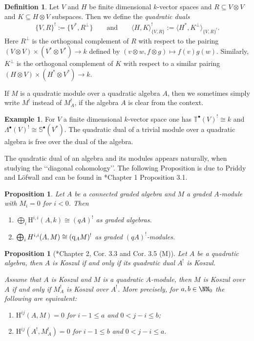 \documentclass{amsart}
\newtheorem{prop}[thm]{Proposition}
\theoremstyle{definition}
\newtheorem{defn}[thm]{Definition}
\newtheorem{exmp}[thm]{Example}
\theoremstyle{remark}
\newcommand{\rmH}{\mathrm{H}}
\numberwithin{equation}{section}
\begin{document}
\begin{defn}
    Let $V$ and $H$ be finite dimensional $k$-vector spaces and $R\subseteq V\otimes V$ and $K\subseteq H\otimes V$ subspaces. Then we define the \emph{quadratic duals}
    \begin{align*}
        \{V,R\}^!:=\{V^*,R^\perp\}\qquad \text{and}\qquad \langle H,K\rangle^!_{\{V,R\}}:=\langle H^*,K^\perp\rangle_{\{V,R\}^!}.
    \end{align*}
    Here $R^\perp$ is the orthogonal complement of $R$ with respect to the pairing $(V\otimes V)\times (V^*\otimes V^*)\to k$ defined by $(v\otimes w,f\otimes g)\mapsto f(v)g(w)$. Similarly, $K^\perp$ is the orthogonal complement of $K$ with respect to a similar pairing $(H\otimes V)\times (H^*\otimes V^*)\to k$.
\end{defn}
If $M$ is a quadratic module over a quadratic algebra $A$, then we sometimes simply write $M^!$ instead of $M^!_A$, if the algebra $A$ is clear from the context.
\begin{exmp}
    For $V$ a finite dimensional $k$-vector space one has $\mathbb{T}^\bullet(V)^!\cong k$ and $\Lambda^\bullet(V)^!\cong \mathbb{S}^\bullet(V^*)$. The quadratic dual of a trivial module over a quadratic algebra is free over the dual of the algebra. 
\end{exmp}
The quadratic dual of an algebra and its modules appears naturally, when studying the \lq\lq diagonal cohomology\rq\rq. The following Proposition is due to Priddy \cite{Priddy1970} and Löfwall \cite{Loeffwall1986} and can be found in \cite{PositselskiPolishchuk2005}*{Chapter 1 Proposition 3.1}.
\begin{prop}
\label{prop:CohomologyAndDuals}
    Let $A$ be a connected graded algebra and $M$ a graded $A$-module with $M_i=0$ for $i<0$. Then 
    \begin{enumerate}
        \item $\bigoplus_{i} \rmH^{i,i}(A,k)\cong (qA)^!$ as graded algebras.
        \item $\bigoplus_{i}H^{i,i}(A,M)\cong ({\rm q}_{A}M)^!$ as graded $(qA)^!$-modules.
    \end{enumerate}
\end{prop}
\begin{prop}[\cite{PositselskiPolishchuk2005}*{Chapter 2, Cor. 3.3 and Cor. 3.5 (M)}]
    \label{prop:SimultaniousKoszul}
    Let $A$ be a quadratic algebra, then $A$ is Koszul if and only if its quadratic dual $A^!$ is Koszul.  
    
    Assume that $A$ is Koszul and $M$ is a quadratic $A$-module, then $M$ is Koszul over $A$ if and only if $M_A^!$ is Koszul over $A^!$. More precisely, for $a,b\in \NN_0$ the following are equivalent:
    \begin{enumerate}
        \item $\rmH^{ij}(A,M)=0$ for $i-1\leq a$ and $0<j-i\leq b$;
        \item $\rmH^{ij}(A^!,M_A^!)=0$ for $i-1\leq b$ and $0<j-i\leq a$.
    \end{enumerate}  
\end{prop}
\end{document}
